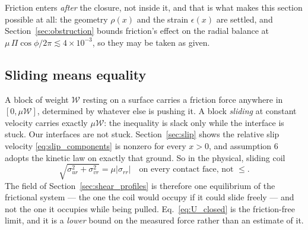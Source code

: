 \documentclass[11pt]{article}
\begin{document}
Friction enters \emph{after} the closure, not inside it, and that is what makes
this section possible at all: the geometry $\rho(x)$ and the strain
$\epsilon(x)$ are settled, and Section~\ref{sec:obstruction} bounds friction's
effect on the radial balance at
$\mu\,\Pi\cos\phi/2\pi \lesssim 4\times10^{-3}$, so they may be taken as given.

\subsection{Sliding means equality}\label{sec:sliding}
A block of weight $\mathcal W$ resting on a
surface carries a friction force anywhere in $\left[0,\mu\mathcal W\right]$,
determined by whatever else is pushing it. A block \emph{sliding} at constant
velocity carries exactly $\mu\mathcal W$: the inequality is slack only while the
interface is stuck. Our interfaces are not stuck.
Section~\ref{sec:slip} shows the relative slip velocity
\eqref{eq:slip_components} is nonzero for every $x > 0$, and assumption 6 adopts
the kinetic law on exactly that ground. So in the physical, sliding coil
\begin{equation}\label{eq:sliding_equality}
    \boxed{\;\sqrt{\sigma_{ur}^{2}+\sigma_{vr}^{2}}
      = \mu\left|\sigma_{rr}\right|
    \quad\text{on every contact face, not }\le.\;}
\end{equation}
The field of Section~\ref{sec:shear_profiles} is therefore one equilibrium of the
frictional system --- the one the coil would occupy if it could slide freely ---
and not the one it occupies while being pulled. Eq.~\eqref{eq:U_closed} is the
friction-free limit, and it is a \emph{lower} bound on the measured force rather
than an estimate of it.
\end{document}
